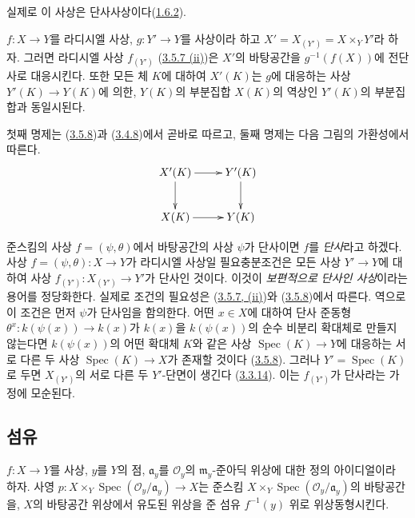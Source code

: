 실제로 이 사상은 단사사상이다(\hyperref[I.1.6.2-ko]{1.6.2}).

\begin{corollary}[3.5.10]
\label{I.3.5.10-ko}
$f:X\to Y$를 라디시엘 사상, $g:Y'\to Y$를 사상이라 하고
$X'=X_{(Y')}=X\times_Y Y'$라 하자. 그러면 라디시엘 사상
$f_{(Y')}$ (\hyperref[I.3.5.7-ko]{3.5.7 (ii)})은 $X'$의 바탕공간을
$g^{-1}(f(X))$에 전단사로 대응시킨다. 또한 모든 체 $K$에 대하여
$X'(K)$는 $g$에 대응하는 사상 $Y'(K)\to Y(K)$에 의한, $Y(K)$의
부분집합 $X(K)$의 역상인 $Y'(K)$의 부분집합과 동일시된다.
\end{corollary}

첫째 명제는 (\hyperref[I.3.5.8-ko]{3.5.8})과
(\hyperref[I.3.4.8-ko]{3.4.8})에서 곧바로 따르고, 둘째 명제는
다음 그림의 가환성에서 따른다.
\label{I.3.5.10.base-change-points-diagram-ko}
\[
  \xymatrix{
    X'(K)\ar[r]\ar[d] & Y'(K)\ar[d]\\
    X(K)\ar[r] & Y(K)
  }
\]

\begin{remark}[3.5.11]
\label{I.3.5.11-ko}
준스킴의 사상 $f=(\psi,\theta)$에서 바탕공간의 사상 $\psi$가
단사이면 $f$를
\emph{단사}라고 하겠다. 사상 $f=(\psi,\theta):X\to Y$가 라디시엘
사상일 필요충분조건은 모든 사상 $Y'\to Y$에 대하여 사상
$f_{(Y')}:X_{(Y')}\to Y'$가 단사인 것이다. 이것이 \emph{보편적으로
단사인 사상}이라는 용어를 정당화한다. 실제로 조건의 필요성은
(\hyperref[I.3.5.7-ko]{3.5.7, (ii)})와
(\hyperref[I.3.5.8-ko]{3.5.8})에서 따른다. 역으로 이 조건은 먼저
$\psi$가 단사임을 함의한다. 어떤 $x\in X$에 대하여 단사 준동형
$\theta^x:k(\psi(x))\to k(x)$가 $k(x)$을 $k(\psi(x))$의 순수
비분리 확대체로 만들지 않는다면
$k(\psi(x))$의 어떤 확대체 $K$와 같은 사상
$\operatorname{Spec}(K)\to Y$에 대응하는 서로 다른 두 사상
$\operatorname{Spec}(K)\to X$가 존재할 것이다
(\hyperref[I.3.5.8-ko]{3.5.8}). 그러나 $Y'=\operatorname{Spec}(K)$로
두면 $X_{(Y')}$의 서로 다른 두 $Y'$-단면이 생긴다
(\hyperref[I.3.3.14-ko]{3.3.14}). 이는 $f_{(Y')}$가 단사라는
가정에 모순된다.
\end{remark}

\subsection{섬유}
\label{subsection:I.3.6-ko}

\begin{proposition}[3.6.1]
\label{I.3.6.1-ko}
$f:X\to Y$를 사상, $y$를 $Y$의 점, $\mathfrak{a}_y$를
$\mathscr{O}_y$의 $\mathfrak{m}_y$-준아딕 위상에 대한 정의
아이디얼이라 하자. 사영
$p:X\times_Y\operatorname{Spec}(\mathscr{O}_y/\mathfrak{a}_y)\to X$는
준스킴 $X\times_Y\operatorname{Spec}(\mathscr{O}_y/\mathfrak{a}_y)$의
바탕공간을, $X$의 바탕공간 위상에서 유도된 위상을 준 섬유
$f^{-1}(y)$ 위로 위상동형시킨다.
\end{proposition}

